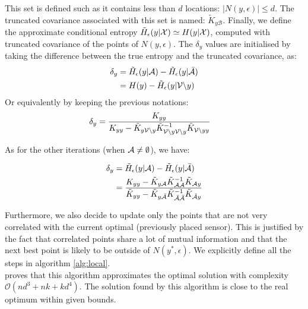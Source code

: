 This set is defined such as it contains less than $d$ locations: $|N(y,\epsilon)| \leq d $. The truncated covariance associated with this set is named: $\tilde{K}_{y\mathcal{B}}$. Finally, we define the approximate conditional entropy $\tilde{H}_\epsilon(y | \mathcal{X}) \simeq H(y | \mathcal{X})$, computed with truncated covariance of the points of $N(y,\epsilon)$. The $\delta_y$ values are initialised by taking the difference between the true entropy and the truncated covariance, as:
\begin{align}
    \delta_y &= \tilde{H}_\epsilon(y | \mathcal{A}) - \tilde{H}_\epsilon(y | \bar{\mathcal{A}}) \\
            &= H(y) - \tilde{H}_\epsilon(y | \mathcal{V} \backslash y )
\end{align}
Or equivalently by keeping the previous notations: 
\begin{align}
    \delta_y &= \frac{K_{yy} }{K_{yy} - \tilde{K}_{y\mathcal{V} \backslash y} \tilde{K}_{\mathcal{V} \backslash y \mathcal{V} \backslash y}^{-1} \tilde{K}_{\mathcal{V} \backslash y y} } \label{equ:initLocal}
\end{align}


As for the other iterations (when $\mathcal{A} \neq \emptyset$), we have: 

\begin{align}
    \delta_y &= \tilde{H}_\epsilon(y | \mathcal{A}) - \tilde{H}_\epsilon(y | \bar{\mathcal{A}}) \\
    &= \frac{K_{yy} - \tilde{K}_{y\mathcal{A}} \tilde{K}_{\mathcal{A}\mathcal{A}}^{-1} \tilde{K}_{\mathcal{A} y} }{\tilde{K}_{yy} - \tilde{K}_{y\bar{\mathcal{A}}} \tilde{K}_{\bar{\mathcal{A}}\bar{\mathcal{A}}}^{-1} \tilde{K}_{\bar{\mathcal{A}} y} } \label{equ:updateLocal}
\end{align}


Furthermore, we also decide to update only the points that are not very correlated with the current optimal (previously placed sensor). This is justified by the fact that correlated points share a lot of mutual information and that the next best point is likely to be outside of $N(y^*,\epsilon)$. We explicitly define all the steps in algorithm \ref{alg:local}. \\



\citet{krause_near-optimal_2008} proves that this algorithm approximates the optimal solution with complexity $\mathcal{O}(nd^3 + nk + kd^4)$. The solution found by this algorithm is close to the real optimum within given bounds. \\


